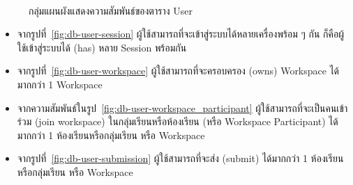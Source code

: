\documentclass[12pt,one side,openright,a4paper]{cpe-thesis-th}
\begin{document}
\begin{enumerate}
\begin{figure}[H]
           \\
          \caption[กลุ่มแผนผังแสดงความสัมพันธ์ของตาราง User]{กลุ่มแผนผังแสดงความสัมพันธ์ของตาราง User}
          \label{fig:db-user}
        \end{figure}
        \begin{itemize}
          \item จากรูปที่~\ref{fig:db-user-session} ผู้ใช้สามารถที่จะเข้าสู่ระบบได้หลายเครื่องพร้อม ๆ กัน ก็คือผู้ใช้เข้าสู่ระบบได้ (has) หลาย Session พร้อมกัน
          \item จากรูปที่~\ref{fig:db-user-workspace} ผู้ใช้สามารถที่จะครอบครอง (owns) Workspace ได้มากกว่า 1 Workspace
          \item จากความสัมพันธ์ในรูป~\ref{fig:db-user-workspace_participant} ผู้ใช้สามารถที่จะเป็นคนเข้าร่วม (join workspace) ในกลุ่มเรียนหรือห้องเรียน (หรือ Workspace Participant) ได้มากกว่า 1 ห้องเรียนหรือกลุ่มเรียน หรือ Workspace
          \item จากรูปที่~\ref{fig:db-user-submission} ผู้ใช้สามารถที่จะส่ง (submit) ได้มากกว่า 1 ห้องเรียนหรือกลุ่มเรียน หรือ Workspace

\end{itemize}
\end{enumerate}
\end{document}
